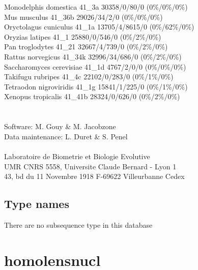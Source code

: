\documentclass{article}
\begin{document}
\begin{Schunk}
Monodelphis domestica                   41\_3a 30358/0/80/0 (0\%/0\%/0\%)\\
Mus musculus                            41\_36b 29026/34/2/0 (0\%/0\%/0\%)\\
Oryctolagus cuniculus                   41\_1a 13705/4/8615/0 (0\%/62\%/0\%)\\
Oryzias latipes                         41\_1 25880/0/546/0 (0\%/2\%/0\%)\\
Pan troglodytes                         41\_21 32667/4/739/0 (0\%/2\%/0\%)\\
Rattus norvegicus                       41\_34k 32996/34/686/0 (0\%/2\%/0\%)\\
Saccharomyces cerevisiae                41\_1d 4767/2/0/0 (0\%/0\%/0\%)\\
Takifugu rubripes                       41\_4c 22102/0/283/0 (0\%/1\%/0\%)\\
Tetraodon nigroviridis                  41\_1g 15841/1/225/0 (0\%/1\%/0\%)\\
Xenopus tropicalis                      41\_41b 28324/0/626/0 (0\%/2\%/0\%)\\
\\
\\
Software: M. Gouy \& M. Jacobzone\\
Data maintenance: L. Duret \& S. Penel\\
\\
Laboratoire de Biometrie et Biologie Evolutive\\
UMR CNRS 5558, Universite Claude Bernard - Lyon 1\\
43, bd du 11 Novembre 1918 F-69622 Villeurbanne Cedex\\


\subsection{Type names}
There are no subsequence type in this database
\section{ homolensnucl }

\end{Schunk}
\end{document}
